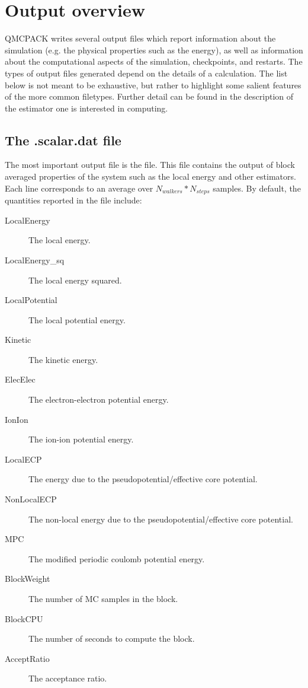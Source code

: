 \chapter{Output overview}
\label{chap:output_overview}

QMCPACK writes several output files which report information about the simulation (e.g. the physical properties such as the energy), as well as information about the computational aspects of the simulation, checkpoints, and restarts.
The types of output files generated depend on the details of a calculation. The list below is not meant to be exhaustive, but rather to highlight some salient features of the more common filetypes. Further detail can be found in the description of the estimator one is interested in computing.


\section{The .scalar.dat file}
\label{sec:scalardat_file}
The most important output file is the  file. This file contains the output of block averaged properties of the system such as the local energy and other estimators.
Each line corresponds to an average over $N_{walkers}*N_{steps}$ samples.
By default, the quantities reported in the  file include:

\begin{description}
\item[LocalEnergy] The local energy.
\item[LocalEnergy\_sq] The local energy squared.
\item[LocalPotential] The local potential energy.
\item[Kinetic] The kinetic energy.
\item[ElecElec] The electron-electron potential energy.
\item[IonIon] The ion-ion potential energy.
\item[LocalECP] The energy due to the pseudopotential/effective core potential.
\item[NonLocalECP] The non-local energy due to the pseudopotential/effective core potential.
\item[MPC] The modified periodic coulomb potential energy.
\item[BlockWeight] The number of MC samples in the block.
\item[BlockCPU] The number of seconds to compute the block.
\item[AcceptRatio] The acceptance ratio.
\end{description}

